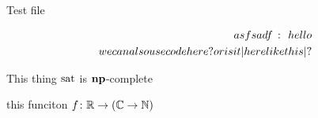 \documentclass[12pt]{article}
\begin{document}
Test file

\begin{align*}
  asfsadf \st hello \\
  we can also use \pinl{code here?} or is it \pinl|here like this|?
\end{align*}

This thing $\text{sat}$ is $\mathbf{np}$-complete


this funciton $f \colon \mathbb{R} \to \left(\mathbb{C} \to \mathbb{N}\right)$


\end{document}
